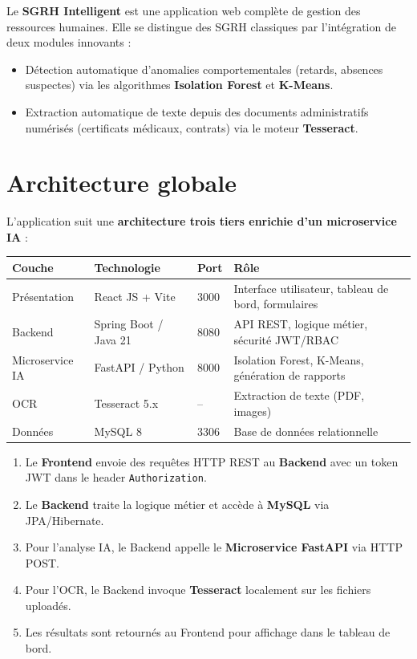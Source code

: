 \documentclass[a4paper,12pt]{report}
\begin{document}
Le \textbf{SGRH Intelligent} est une application web complète de gestion des ressources humaines. Elle se distingue des SGRH classiques par l'intégration de deux modules innovants :

\begin{itemize}[leftmargin=2cm]
  \item[\textbf{IA}] Détection automatique d'anomalies comportementales (retards, absences suspectes) via les algorithmes \textbf{Isolation Forest} et \textbf{K-Means}.
  \item[\textbf{OCR}] Extraction automatique de texte depuis des documents administratifs numérisés (certificats médicaux, contrats) via le moteur \textbf{Tesseract}.
\end{itemize}

\section{Architecture globale}

L'application suit une \textbf{architecture trois tiers enrichie d'un microservice IA} :

\begin{center}
\begin{tabularx}{\textwidth}{|l|l|l|X|}
\hline
\textbf{Couche} & \textbf{Technologie} & \textbf{Port} & \textbf{Rôle} \\
\hline
Présentation & React JS + Vite & 3000 & Interface utilisateur, tableau de bord, formulaires \\
\hline
Backend & Spring Boot / Java 21 & 8080 & API REST, logique métier, sécurité JWT/RBAC \\
\hline
Microservice IA & FastAPI / Python & 8000 & Isolation Forest, K-Means, génération de rapports \\
\hline
OCR & Tesseract 5.x & -- & Extraction de texte (PDF, images) \\
\hline
Données & MySQL 8 & 3306 & Base de données relationnelle \\
\hline
\end{tabularx}
\end{center}

\begin{infobox}
\begin{enumerate}
  \item Le \textbf{Frontend} envoie des requêtes HTTP REST au \textbf{Backend} avec un token JWT dans le header \texttt{Authorization}.
  \item Le \textbf{Backend} traite la logique métier et accède à \textbf{MySQL} via JPA/Hibernate.
  \item Pour l'analyse IA, le Backend appelle le \textbf{Microservice FastAPI} via HTTP POST.
  \item Pour l'OCR, le Backend invoque \textbf{Tesseract} localement sur les fichiers uploadés.
  \item Les résultats sont retournés au Frontend pour affichage dans le tableau de bord.
\end{enumerate}
\end{infobox}
\end{document}

